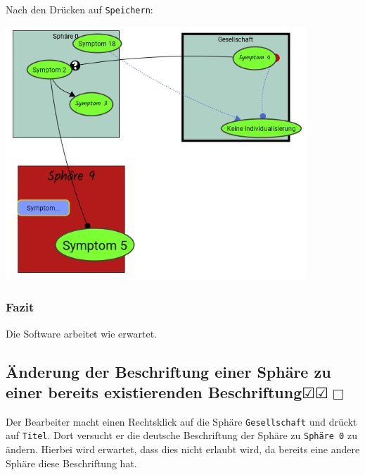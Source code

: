 \documentclass[enabledeprecatedfontcommands]{scrartcl}
\newcommand{\subsectiont}[2]{\subsection[#1]{#1{\normalsize\normalfont #2}}}
\newcommand{\leer}{$\Box$}
\newcommand{\ok}{$\CheckedBox$}
\begin{document}
Nach den Drücken auf \texttt{Speichern}:
\begin{center}
\includegraphics[height=9.5cm]{3_49speichern.PNG}
\end{center}
\subsubsection{Fazit}
Die Software arbeitet wie erwartet.

\subsectiont{Änderung der Beschriftung einer Sphäre zu einer bereits existierenden Beschriftung}{\dotfill\ok\ok\leer}
Der Bearbeiter macht einen Rechtsklick auf die Sphäre \texttt{Gesellschaft} und drückt auf \texttt{Titel}. Dort versucht er die deutsche Beschriftung der Sphäre zu \texttt{Sphäre 0} zu ändern. Hierbei wird erwartet, dass dies nicht erlaubt wird, da bereits eine andere Sphäre diese Beschriftung hat. 
\end{document}
